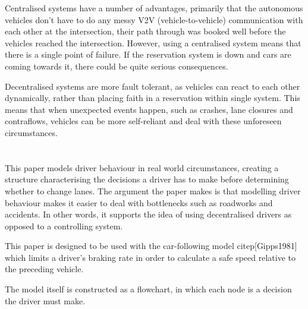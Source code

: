 Centralised systems have a number of advantages, primarily that the autonomous vehicles don't have to do any messy V2V (vehicle-to-vehicle) communication with each other at the intersection, their path through was booked well before the vehicles reached the intersection. However, using a centralised system means that there is a single point of failure. If the reservation system is down and cars are coming towards it, there could be quite serious consequences.

Decentralised systems are more fault tolerant, as vehicles can react to each other dynamically, rather than placing faith in a reservation within single system. This means that when unexpected events happen, such as crashes, lane closures and contraflows, vehicles can be more self-reliant and deal with these unforeseen circumstances.

\section{}
\label{sec:Gipps1986}
This paper models driver behaviour in real world circumstances, creating a structure characterising the decisions a driver has to make before determining whether to change lanes. The argument the paper makes is that modelling driver behaviour makes it easier to deal with bottlenecks such as roadworks and accidents. In other words, it supports the idea of using decentralised drivers as opposed to a controlling system.

This paper is designed to be used with the car-following model citep[Gipps1981] which limits a driver's braking rate in order to calculate a safe speed relative to the preceding vehicle.


The model itself is constructed as a flowchart, in which each node is a decision the driver must make.

